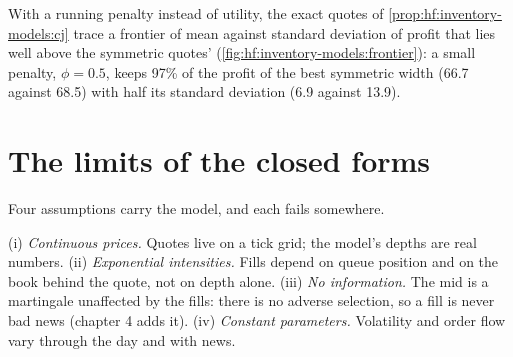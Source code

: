 With a running penalty instead of utility, the exact quotes of \cref{prop:hf:inventory-models:cj} trace a frontier of mean against standard
deviation of profit that lies well above the symmetric quotes' (\cref{fig:hf:inventory-models:frontier}): a small penalty, $\phi=0.5$, keeps
97\% of the profit of the best symmetric width (66.7 against 68.5) with half its standard deviation (6.9 against 13.9).

\begin{omfigure}

\label{fig:hf:inventory-models:frontier}
\end{omfigure}

\section{The limits of the closed forms}\label{sec:hf:inventory-models:limits}

Four assumptions carry the model, and each fails somewhere.

\begin{remark}\label{rem:hf:inventory-models:limits}
(i) \emph{Continuous prices.} Quotes live on a tick grid; the model's depths are real numbers. (ii) \emph{Exponential intensities.} Fills depend
on queue position and on the book behind the quote, not on depth alone. (iii) \emph{No information.} The mid is a martingale unaffected by the fills:
there is no adverse selection, so a fill is never bad news (chapter 4 adds it). (iv) \emph{Constant parameters.} Volatility and order flow vary
through the day and with news.
\end{remark}

